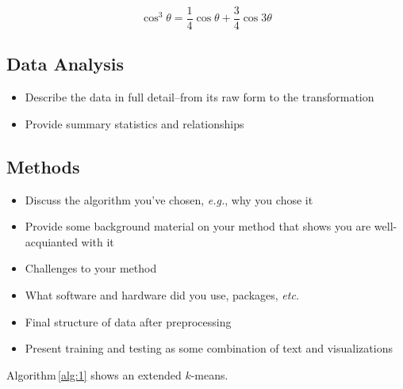 \documentclass[fleqn,10pt]{SelfArx} %
\begin{document}
\lipsum[4] %

\begin{equation}
\cos^3 \theta =\frac{1}{4}\cos\theta+\frac{3}{4}\cos 3\theta
\label{eq:refname2}
\end{equation}

\lipsum[5] %


\subsection{Data Analysis}
\begin{itemize}[noitemsep]
\item Describe the data in full detail--from its raw form to the transformation
\item Provide summary statistics and relationships
\end{itemize}

\lipsum[6] %

\subsection{Methods}
\begin{itemize}[noitemsep]
\item Discuss the algorithm you've chosen, \textit{e.g.}, why you chose it
\item Provide some background material on your method that shows you are well-acquianted with it
\item Challenges to your method
\item What software and hardware did you use, packages, \textit{etc.}
\item Final structure of data after preprocessing
\item Present training and testing as some combination of text and visualizations
\end{itemize}
Algorithm\,\ref{alg:1} shows an extended $k$-means.
\end{document}
